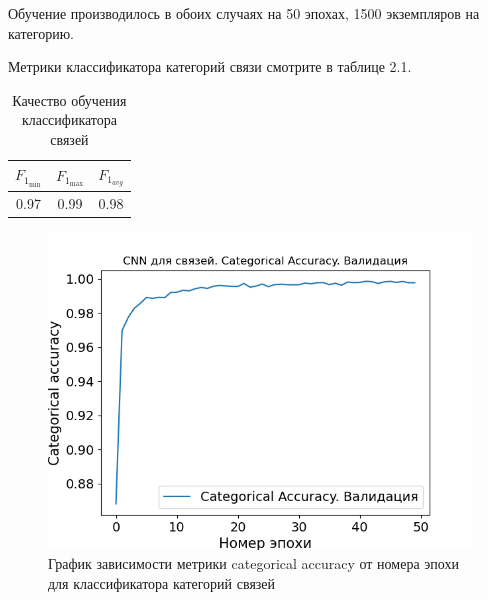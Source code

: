 Обучение производилось в обоих случаях на 50 эпохах, 1500 экземпляров на категорию.

Метрики классификатора категорий связи смотрите в таблице 2.1.

\begin{table}[htbp]%
	\centering
	\label{tab:bondquality}		
		\begin{tabular}{|c|c|c|}
			\hline
			$F_{1_{\min}}$ & $F_{1_{\max}}$ & $F_{1_{avg}}$ \\
			\hline
			0.97 & 0.99 & 0.98 \\
			\hline
		\end{tabular}
	\caption{Качество обучения классификатора связей}
\end{table}

\begin{figure}[h!] 
	\center
	\includegraphics [scale=0.8] {my_folder/images/bonddir_accuracy}
	\caption{График зависимости метрики categorical accuracy от номера эпохи для классификатора категорий связей}
	\label{fig:AP50_bonddir_accuracy}
\end{figure}

